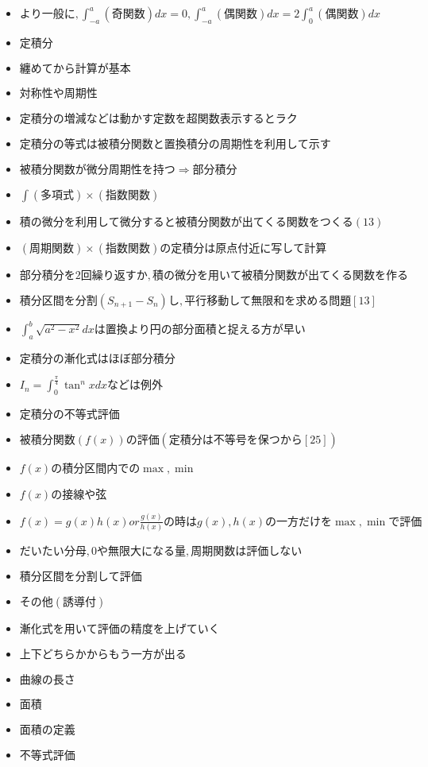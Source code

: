 \documentclass[dvipdfmx,uplatex]{jsarticle}
\begin{document}
\begin{itemize}
		\item $ より一般に, \int^a_{-a} (奇関数)dx = 0, \int^a_{-a} (偶関数)dx = 2\int^a_{0} (偶関数)dx$
	\item $ 定積分$
		\item $ 纏めてから計算が基本$
			\item $ 対称性や周期性$
			\item $ 定積分の増減などは動かす定数を超関数表示するとラク$
		\item $ 定積分の等式は被積分関数と置換積分の周期性を利用して示す$
		\item $ 被積分関数が微分周期性を持つ⇒部分積分$
			\item $ \int (多項式) \times (指数関数)$
			\item $ 積の微分を利用して微分すると被積分関数が出てくる関数をつくる(13)$
		\item $ (周期関数) \times (指数関数) の定積分は原点付近に写して計算$
			\item $ 部分積分を2回繰り返すか,積の微分を用いて被積分関数が出てくる関数を作る$
			\item $ 積分区間を分割(S_{n+1} - S_n)し,平行移動して無限和を求める問題 [13]$
		\item $ \int^b_a \sqrt{a^2 - x^2}dx は置換より円の部分面積と捉える方が早い$
		\item $ 定積分の漸化式はほぼ部分積分$
			\item $ I_n = \int^{\frac{\pi}{4}}_0 \tan^n x dx などは例外$
			\item $ 定積分の不等式評価$
				\item $ 被積分関数(f(x))の評価 (定積分は不等号を保つから [25])$
					\item $ f(x)の積分区間内での\max, \min$
					\item $ f(x)の接線や弦$
					\item $ f(x) = g(x)h(x) or \frac{g(x)}{h(x)} の時は g(x), h(x) の一方だけを \max , \min で評価$
						\item $ だいたい分母, 0や無限大になる量, 周期関数は評価しない$
					\item $ 積分区間を分割して評価$
					\item $ その他(誘導付)$
				\item $ 漸化式を用いて評価の精度を上げていく$
					\item $ 上下どちらかからもう一方が出る$
	\item $ 曲線の長さ$
	\item $ 面積$
		\item $ 面積の定義$
		\item $ 不等式評価$

\end{itemize}
\end{document}
